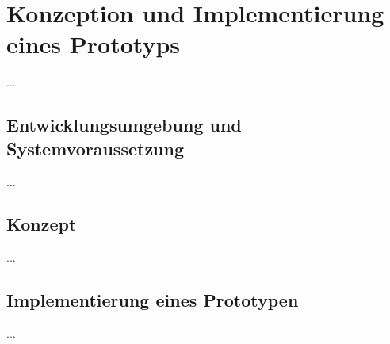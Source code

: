 \chapter{Konzeption und Implementierung eines Prototyps}
\label{sec:Konzeption und Implementierung eines Prototyps}

...

\section{Entwicklungsumgebung und Systemvoraussetzung}
\label{sec:Entwicklungsumgebung und Systemvoraussetzung}

...

\section{Konzept}
\label{sec:Konzept}

...

\section{Implementierung eines Prototypen}
\label{sec:Implementierung eines Prototypen}

...